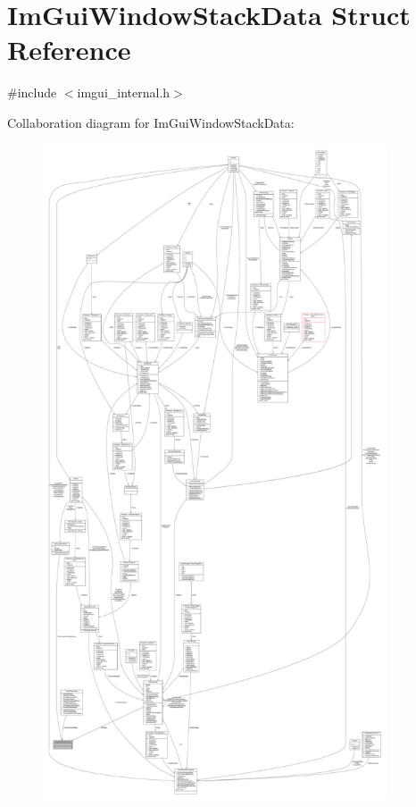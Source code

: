 \hypertarget{structImGuiWindowStackData}{}\section{Im\+Gui\+Window\+Stack\+Data Struct Reference}
\label{structImGuiWindowStackData}


{\ttfamily \#include $<$imgui\+\_\+internal.\+h$>$}



Collaboration diagram for Im\+Gui\+Window\+Stack\+Data\+:
\nopagebreak
\begin{figure}[H]
\begin{center}
\leavevmode
\includegraphics[height=550pt]{structImGuiWindowStackData__coll__graph}
\end{center}
\end{figure}
